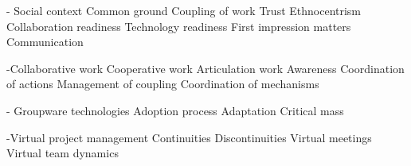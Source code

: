 - Social context
Common ground
Coupling of work
Trust
Ethnocentrism
Collaboration readiness
Technology readiness
First impression matters
Communication

-Collaborative work
Cooperative work
Articulation work
Awareness
Coordination of actions
Management of coupling
Coordination of mechanisms

- Groupware technologies
Adoption process
Adaptation
Critical mass

-Virtual project management
Continuities
Discontinuities
Virtual meetings
Virtual team dynamics

